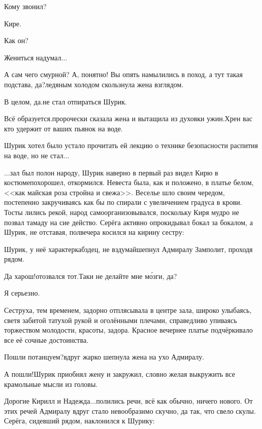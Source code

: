 {\diagdash Кому звонил?

\diagdash Кире.

\diagdash Как он? 

\diagdash Жениться надумал$\ldots$ 

\diagdash А сам чего смурной? А, понятно! Вы опять намылились в поход, а тут такая подстава, да?\mdash ледяным холодом скользнула жена взглядом.

\diagdash В целом, да.\mdash не стал отпираться Шурик.

\diagdash Всё образуется.\mdash пророчески сказала жена и вытащила из духовки ужин.\mdash Хрен вас кто удержит от ваших пьянок на воде.

Шурик хотел было устало прочитать ей лекцию о технике безопасности распития на воде, но не стал$\ldots$ 

\vspace{0.5cm}

$\ldots$зал был полон народу, Шурик наверно в первый раз видел Кирю в костюме\mdash похорошел, откормился. Невеста была, как и положено, в платье белом, <<как майская роза стройна и свежа>>. Веселье шло своим чередом, постепенно закручиваясь как бы по спирали с увеличением градуса в крови. Тосты лились рекой, народ самоорганизовывался, поскольку Киря мудро не позвал тамаду на сие действо. Серёга активно опрокидывал бокал за бокалом, а Шурик, не отставая, полвечера косился на кирину сестру:

\diagdash Шурик, у неё характер\mdash кабздец, не вздумай\mdash шепнул Адмиралу Замполит, проходя рядом. 

\diagdash Да харош!\mdash отозвался тот.\mdash Таки не делайте мне м\'{о}зги, да?

\diagdash Я серьезно.

Сеструха, тем временем, задорно отплясывала в центре зала, широко улыбаясь, светя забитой татухой рукой и оголёнными плечами, справедливо упиваясь торжеством молодости, красоты, задора. Красное вечернее платье подчёркивало все её сочные достоинства.

\diagdash Пошли потанцуем?\mdash вдруг жарко шепнула жена на ухо Адмиралу.

\diagdash А пошли!\mdash Шурик приобнял жену и закружил, словно желая выкружить все крамольные мысли из головы. 

\diagdash Дорогие Кирилл и Надежда$\ldots$\mdash полились речи, всё как обычно, ничего нового. От этих речей Адмиралу вдруг стало невообразимо скучно, да так, что свело скулы. Серёга, сидевший рядом, наклонился к Шурику:

}

